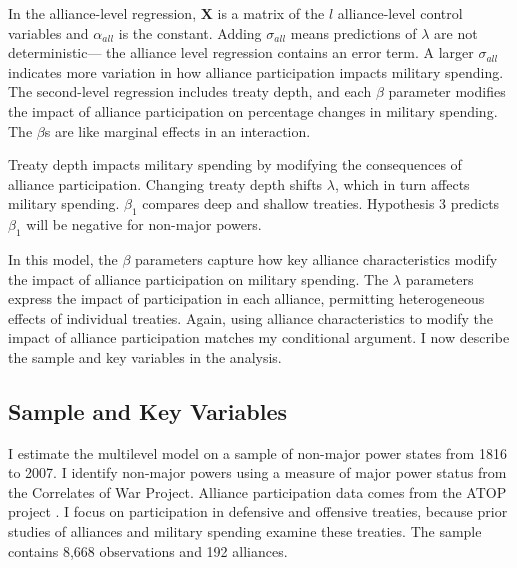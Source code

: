 \documentclass[12pt]{article}
\begin{document}
In the alliance-level regression, $\textbf{X}$ is a matrix of the $l$ alliance-level control variables and $\alpha_{all}$ is the constant.
Adding $\sigma_{all}$ means predictions of $\lambda$ are not deterministic--- the alliance level regression contains an error term. 
A larger $\sigma_{all}$ indicates more variation in how alliance participation impacts military spending. 
The second-level regression includes treaty depth, and each $\beta$ parameter modifies the impact of alliance participation on percentage changes in military spending. 
The $\beta$s are like marginal effects in an interaction. 


Treaty depth impacts military spending by modifying the consequences of alliance participation. 
Changing treaty depth shifts $\lambda$, which in turn affects military spending.
$\beta_1$ compares deep and shallow treaties. 
Hypothesis 3 predicts $\beta_1$ will be negative for non-major powers. 


In this model, the $\beta$ parameters capture how key alliance characteristics modify the impact of alliance participation on military spending. 
The $\lambda$ parameters express the impact of participation in each alliance, permitting heterogeneous effects of individual treaties. 
Again, using alliance characteristics to modify the impact of alliance participation matches my conditional argument. 
I now describe the sample and key variables in the analysis.  



\subsection{Sample and Key Variables} 

I estimate the multilevel model on a sample of non-major power states from 1816 to 2007. 
I identify non-major powers using a measure of major power status from the Correlates of War Project. 
Alliance participation data comes from the ATOP project \citep{Leedsetal2002}.  
I focus on participation in defensive and offensive treaties, because prior studies of alliances and military spending examine these treaties. 
The sample contains 8,668 observations and 192 alliances. 
\end{document}
